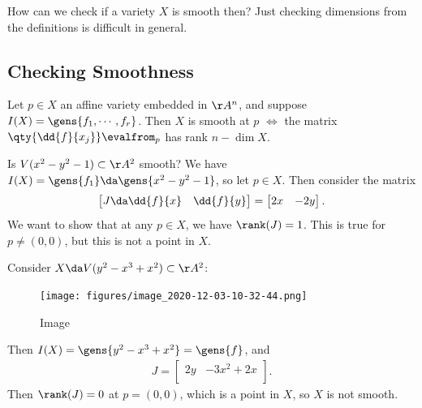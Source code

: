 \begin{remark}

How can we check if a variety \(X\) is smooth then? Just checking
dimensions from the definitions is difficult in general.

\end{remark}

\hypertarget{checking-smoothness}{%
\subsection{Checking Smoothness}\label{checking-smoothness}}

\begin{proposition}

Let \(p\in X\) an affine variety embedded in \(\AA^n\), and suppose
\(I(X) = \gens{f_1, \cdots, f_r}\). Then \(X\) is smooth at \(p\)
\(\iff\) the matrix \(\qty{\dd{f}{x_j}}\evalfrom_{p}\) has rank
\(n - \dim X\).

\end{proposition}

\begin{example}[?]

Is \(V(x^2 - y^2 - 1) \subset \AA^2\) smooth? We have
\(I(X) = \gens{f_1} \da \gens{x^2 - y^2 - 1}\), so let \(p\in X\). Then
consider the matrix
\begin{align*}  
\begin{bmatrix}
J \da 
\dd{f}{x} & \dd{f}{y} \\
\end{bmatrix} = 
\begin{bmatrix}
2x & -2y \\
\end{bmatrix}
.\end{align*} We want to show that at any \(p\in X\), we have
\(\rank(J) = 1\). This is true for \(p\neq (0, 0)\), but this is not a
point in \(X\).

\end{example}

\begin{example}[?]

Consider \(X \da V(y^2 - x^3 + x^2) \subset \AA^2\):

\begin{figure}
\centering
\texttt{[image: figures/image\_2020-12-03-10-32-44.png]}
\caption{Image}
\end{figure}

Then \(I(X) = \gens{y^2 - x^3 + x^2} = \gens{f}\), and
\begin{align*}  
J = 
\begin{bmatrix}
2y & -3x^2 + 2x \\
\end{bmatrix}
.\end{align*} Then \(\rank(J) = 0\) at \(p = (0, 0)\), which is a point
in \(X\), so \(X\) is not smooth.

\end{example}

